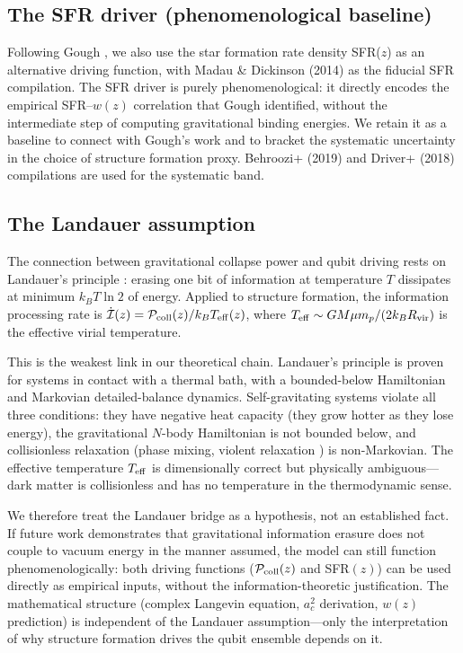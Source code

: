 \documentclass[aps,prd,twocolumn,superscriptaddress]{revtex4-2}
\begin{document}
\subsection{The SFR driver (phenomenological baseline)}

Following Gough \cite{Gough:2025}, we also use the star formation rate density SFR($z$) as an alternative driving function, with Madau \& Dickinson (2014) \cite{Madau:2014} as the fiducial SFR compilation. The SFR driver is purely phenomenological: it directly encodes the empirical SFR--$w(z)$ correlation that Gough identified, without the intermediate step of computing gravitational binding energies. We retain it as a baseline to connect with Gough's work and to bracket the systematic uncertainty in the choice of structure formation proxy. Behroozi+ (2019) \cite{Behroozi:2019} and Driver+ (2018) \cite{Driver:2018} compilations are used for the systematic band.

\subsection{The Landauer assumption}
\label{sec:landauer}

The connection between gravitational collapse power and qubit driving rests on Landauer's principle \cite{Landauer:1961}: erasing one bit of information at temperature $T$ dissipates at minimum $k_B T \ln 2$ of energy. Applied to structure formation, the information processing rate is $\dot{\mathcal{I}}(z) = \mathcal{P}_{\rm coll}(z) / k_B T_{\rm eff}(z)$, where $T_{\rm eff} \sim GM\mu m_p/(2k_B R_{\rm vir})$ is the effective virial temperature.

This is the weakest link in our theoretical chain. Landauer's principle is proven for systems in contact with a thermal bath, with a bounded-below Hamiltonian and Markovian detailed-balance dynamics. Self-gravitating systems violate all three conditions: they have negative heat capacity (they grow hotter as they lose energy), the gravitational $N$-body Hamiltonian is not bounded below, and collisionless relaxation (phase mixing, violent relaxation \cite{LyndenBell:1967}) is non-Markovian. The effective temperature $T_{\rm eff}$ is dimensionally correct but physically ambiguous---dark matter is collisionless and has no temperature in the thermodynamic sense.

We therefore treat the Landauer bridge as a hypothesis, not an established fact. If future work demonstrates that gravitational information erasure does not couple to vacuum energy in the manner assumed, the model can still function phenomenologically: both driving functions ($\mathcal{P}_{\rm coll}(z)$ and SFR$(z)$) can be used directly as empirical inputs, without the information-theoretic justification. The mathematical structure (complex Langevin equation, $a_c^2$ derivation, $w(z)$ prediction) is independent of the Landauer assumption---only the interpretation of why structure formation drives the qubit ensemble depends on it.
\end{document}
